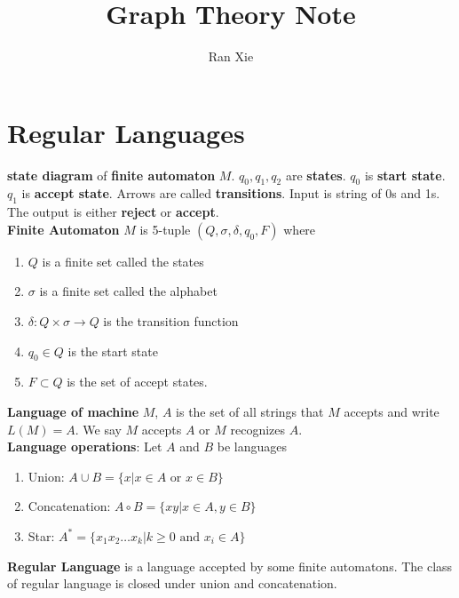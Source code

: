 \documentclass[12pt]{article}
\title{Graph Theory Note}
\author{Ran Xie}
\begin{document}
	\twocolumn
	\maketitle
	\section{Regular Languages}


\textbf{state diagram} of \textbf{finite automaton} $M$. $q_0,q_1,q_2$ are \textbf{states}. $q_0$ is \textbf{start state}. $q_1$ is \textbf{accept state}. Arrows are called \textbf{transitions}. Input is string of 0s and 1s. The output is either \textbf{reject} or \textbf{accept}.\\

\textbf{Finite Automaton} $M$ is 5-tuple $(Q, \sigma, \delta, q_0, F)$ where
\begin{enumerate}
	\item $Q$ is a finite set called the states
	\item $\sigma$ is a finite set called the alphabet
	\item $\delta : Q \times \sigma \rightarrow Q$ is the transition function
	\item $q_0 \in Q$ is the start state
	\item $F \subset Q$ is the set of accept states.
\end{enumerate}

\textbf{Language of machine }$M$, $A$ is the set of all strings that $M$ accepts and write $L(M) = A$. We say $M$ accepts $A$ or $M$ recognizes $A$. \\

\textbf{Language operations}: Let $A$ and $B$ be languages 
\begin{enumerate}
	\item Union: $A\cup B = \{x|x\in A \mbox{ or } x\in B\}$
	\item Concatenation: $A \circ B = \{xy| x\in A, y\in B\}$
	\item Star: $A^* = \{x_1x_2\ldots x_k| k \geq 0 \mbox{ and } x_i \in A \}$
\end{enumerate}

\textbf{Regular Language} is a language accepted by some finite automatons. The class of regular language is closed under union and concatenation.


	
	
\end{document}
